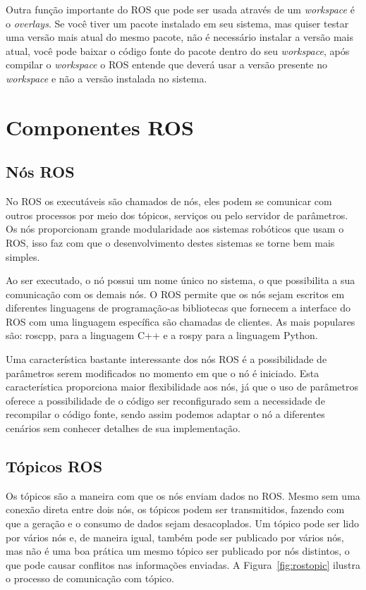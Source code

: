 Outra função importante do ROS que pode ser usada através de um \textit{workspace} é o \textit{overlays}. Se você tiver um pacote instalado em seu sistema, mas quiser testar uma versão mais atual do mesmo pacote, não é necessário instalar a versão mais atual, você pode baixar o código fonte do pacote dentro do seu \textit{workspace}, após compilar o \textit{workspace} o ROS entende que deverá usar a versão presente no \textit{workspace} e não a versão instalada no sistema.


\section{Componentes ROS}

\subsection{Nós ROS}
No ROS os executáveis são chamados de nós, eles podem se comunicar com outros processos por meio dos tópicos, serviços ou pelo servidor de parâmetros. Os nós proporcionam grande modularidade aos sistemas robóticos que usam o ROS, isso faz com que o desenvolvimento destes sistemas se torne bem mais simples.

Ao ser executado, o nó possui um nome único no sistema, o que possibilita a sua comunicação com os demais nós. O ROS permite que os nós sejam escritos em diferentes linguagens de programação-as bibliotecas que fornecem a interface do ROS com uma linguagem específica são chamadas de clientes. As mais populares são: roscpp, para a linguagem C++ e a rospy para a linguagem Python.

Uma característica bastante interessante dos nós ROS é a possibilidade de parâmetros serem modificados no momento em que o nó é iniciado. Esta característica proporciona maior flexibilidade aos nós, já que o uso de parâmetros oferece a possibilidade de o código ser reconfigurado sem a necessidade de recompilar o código fonte, sendo assim podemos adaptar o nó a diferentes cenários sem conhecer detalhes de sua implementação. 


\subsection{Tópicos ROS}

Os tópicos são a maneira com que os nós enviam dados no ROS\@. Mesmo sem uma conexão direta entre dois nós, os tópicos podem ser transmitidos, fazendo com que a geração e o consumo de dados sejam desacoplados. Um tópico pode ser lido por vários nós e, de maneira igual, também pode ser publicado por vários nós, mas não é uma boa prática um mesmo tópico ser publicado por nós distintos, o que pode causar conflitos nas informações enviadas. A Figura~\ref{fig:rostopic} ilustra o processo de comunicação com tópico.

